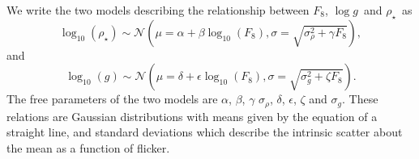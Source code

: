 \documentclass[apjl]{emulateapj}
\newcommand{\logg}{$\log g$}
\newcommand{\rhostar}{$\rho_{\star}$}
\begin{document}
We write the two models describing the relationship between $F_8$, \logg\ and
\rhostar\ as
\begin{equation}
	\log_{10}(\rho_\star) \sim \mathcal{N} \left(\mu = \alpha + \beta
	\log_{10}(F_8), \sigma = \sqrt{\sigma_{\rho}^2 + \gamma F_8}\right),
\end{equation}
\label{eq:rho}
and
\begin{equation}
	\log_{10}(g) \sim \mathcal{N}\left(\mu = \delta + \epsilon \log_{10}(F_8),
	\sigma = \sqrt{\sigma_g^2 + \zeta F_8}\right).
\end{equation}
\label{eq:logg}
The free parameters of the two models are $\alpha$, $\beta$, $\gamma$
$\sigma_{\rho}$, $\delta$, $\epsilon$, $\zeta$ and $\sigma_g$.
These relations are Gaussian distributions with means
given by the equation of a straight line, and standard deviations which
describe the intrinsic scatter about the mean as a function of flicker.
\end{document}
